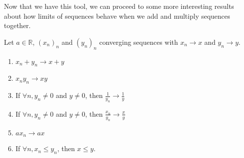 \documentclass[../real_analysis.tex]{subfiles}
\begin{document}
        Now that we have this tool, we can proceed to some more interesting results about how limits of sequences behave when we add and multiply sequences together.
        \begin{theorem}\label{seq-lim-props}
            Let $a\in\mathbb{R}$, $(x_n)_n$ and $(y_n)_n$ converging sequences with $x_n\to x$ and $y_n\to y$.
            \begin{enumerate}[label={\upshape(\roman*)}]
                \item $x_n+y_n\to x+y$
                \item $x_ny_n\to xy$
                \item If $\forall n, y_n\neq0$ and $y\neq0$, then $\frac{1}{y_n}\to\frac{1}{y}$
                \item If $\forall n, y_n\neq0$ and $y\neq0$, then $\frac{x_n}{y_n}\to\frac{x}{y}$
                \item $ax_n\to ax$
                \item If $\forall n, x_n\leq y_n$, then $x\leq y$.
            \end{enumerate}
        \end{theorem}
\end{document}
